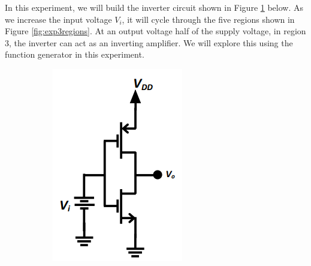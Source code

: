 \documentclass{report}
\begin{document}
In this experiment, we will build the inverter circuit shown in Figure \ref{fig:exp3ckt} below. As we increase the input voltage $V_i$, it will cycle through the five regions shown in Figure \ref{fig:exp3regions}. At an output voltage half of the supply voltage, in region 3, the inverter can act as an inverting amplifier. We will explore this using the function generator in this experiment.

\begin{figure}[h]
	\centering
	\begin{subfigure}{0.25\linewidth}
		\centering
		\includegraphics[width=\linewidth]{exp3ckt}
		\caption{}
		\label{fig:exp3ckt}
	\end{subfigure}
	\hfill
	\begin{subfigure}{0.65\linewidth}
		\centering

\end{subfigure}
\end{figure}
\end{document}
